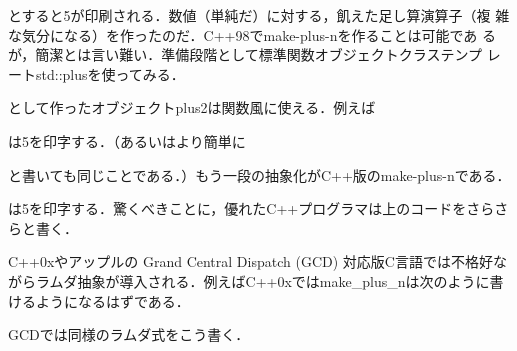 \documentclass[a5paper,twoside,fleqn,draft]{jsbook}
\begin{document}

とすると5が印刷される．数値（単純だ）に対する，飢えた足し算演算子（複
  雑な気分になる）を作ったのだ．C++98でmake-plus-nを作ることは可能であ
るが，簡潔とは言い難い．準備段階として標準関数オブジェクトクラステンプ
レートstd::plusを使ってみる．


として作ったオブジェクトplus2は関数風に使える．例えば


は5を印字する．（あるいはより簡単に


と書いても同じことである．）もう一段の抽象化がC++版のmake-plus-nである．


は5を印字する．驚くべきことに，優れたC++プログラマは上のコードをさらさ
らと書く．

C++0xやアップルの Grand Central Dispatch (GCD) 対応版C言語では不格好な
がらラムダ抽象が導入される．例えばC++0xではmake\_plus\_nは次のように書
けるようになるはずである．


GCDでは同様のラムダ式をこう書く．

\end{document}
